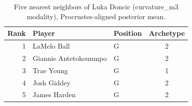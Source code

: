 \begin{table}[htbp]
  \centering\small
  \begin{tabular}{rllc}
    \toprule
    Rank & Player & Position & Archetype \\
    \midrule
    1 & LaMelo Ball & G & 2 \\
    2 & Giannis Antetokounmpo & G & 2 \\
    3 & Trae Young & G & 1 \\
    4 & Josh Giddey & G & 2 \\
    5 & James Harden & G & 2 \\
    \bottomrule
  \end{tabular}
  \caption{Five nearest neighbors of Luka Doncic (curvature_m3 modality), Procrustes-aligned posterior mean.}
  \label{tab:Luka_Doncic_neighbors_curvature_m3}
\end{table}

